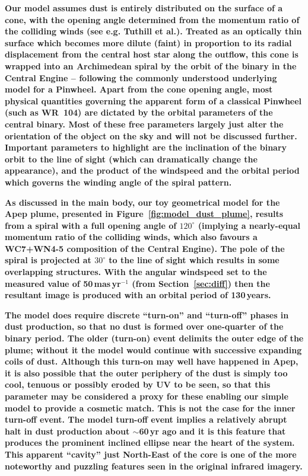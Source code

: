 \documentclass[preprint,times]{aastex61}
\begin{document}
\textbf{Our model assumes dust is entirely distributed on the surface of a cone, with the opening angle determined from the momentum ratio of the colliding winds (see e.g. Tuthill et al.\cite{tuthill2008}). Treated as an optically thin surface which becomes more dilute (faint) in proportion to its radial displacement from the central host star along the outflow, this cone is wrapped into an Archimedean spiral by the orbit of the binary in the Central Engine -- following the commonly understood underlying model for a Pinwheel. Apart from the cone opening angle, most physical quantities governing the apparent form of a classical Pinwheel (such as WR~104) are dictated by the orbital parameters of the central binary. Most of these free parameters largely just alter the orientation of the object on the sky and will not be discussed further. Important parameters to highlight are the inclination of the binary orbit to the line of sight (which can dramatically change the appearance), and the product of the windspeed and the orbital period which governs the winding angle of the spiral pattern. }

\textbf{As discussed in the main body, our toy geometrical model for the Apep plume, presented in Figure~\ref{fig:model_dust_plume}, results from a spiral with a full opening angle of $120^\circ$ (implying a nearly-equal momentum ratio of the colliding winds, which also favours a WC7+WN4-5 composition of the Central Engine). The pole of the spiral is projected at $30^\circ$ to the line of sight which results in some overlapping structures. With the angular windspeed set to the measured value of 50\,mas\,yr$^{-1}$ (from Section~\ref{sec:diff}) then the resultant image is produced with an orbital period of 130\,years.}

\textbf{The model does require discrete ``turn-on'' and ``turn-off'' phases in dust production, so that no dust is formed over one-quarter of the binary period.  The older (turn-on) event delimits the outer edge of the plume; without it the model would continue with successive expanding coils of dust. Although this turn-on may well have happened in Apep, it is also possible that the outer periphery of the dust is simply too cool, tenuous or possibly eroded by UV to be seen, so that this parameter may be considered a proxy for these enabling our simple model to provide a cosmetic match. This is not the case for the inner turn-off event. The model turn-off event implies a relatively abrupt halt in dust production about $\sim$60\,yr ago and it is this feature that produces the prominent inclined ellipse near the heart of the system. This apparent ``cavity'' just North-East of the core is one of the more noteworthy and puzzling features seen in the original infrared imagery.}
\end{document}
